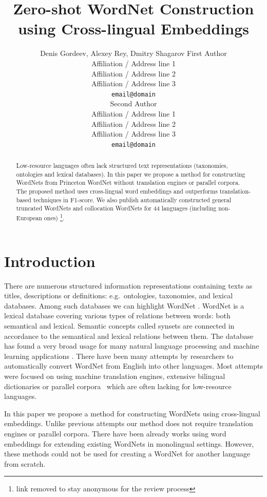 \documentclass[11pt,a4paper]{article}
\title{Zero-shot WordNet Construction using Cross-lingual Embeddings}
\author{Denis Gordeev, Alexey Rey, Dmitry Shagarov
	First Author \\
  Affiliation / Address line 1 \\
  Affiliation / Address line 2 \\
  Affiliation / Address line 3 \\
  \texttt{email@domain} \\\And
  Second Author \\
  Affiliation / Address line 1 \\
  Affiliation / Address line 2 \\
  Affiliation / Address line 3 \\
  \texttt{email@domain} \\}
\date{}
\begin{document}
\maketitle
\begin{abstract}
Low-resource languages often lack structured text representations (taxonomies, ontologies and lexical databases). In this paper we propose a method for constructing WordNets from Princeton WordNet without translation engines or parallel corpora. The proposed method uses cross-lingual word embeddings and outperforms translation-based techniques in F1-score. We also publish automatically constructed general truncated WordNets and collocation WordNets for 44 languages (including non-European ones) \footnote{link removed to stay anonymous for the review process}.
\end{abstract}

\section{Introduction}

There are numerous structured information representations containing texts as titles, descriptions or definitions: e.g.\ ontologies, taxonomies, and lexical databases. Among such databases we can highlight WordNet \cite{wordnet}. WordNet is a lexical database covering various types of relations between words: both semantical and lexical. Semantic concepts called synsets are connected in accordance to the semantical and lexical relations between them. The database has found a very broad usage for many natural language processing and machine learning applications \cite{kutuzovgraphwordnet,mao-semeval}.
There have been many attempts by researchers to automatically convert WordNet from English into other languages. Most attempts were focused on using machine translation engines, extensive bilingual dictionaries or parallel corpora~\cite{Khodak2017,NEALE18.1030} which are often lacking for low-resource languages.

In this paper we propose a method for constructing WordNets using cross-lingual embeddings. Unlike previous attempts our method does not require translation engines or parallel corpora. There have been already works using word embeddings for extending existing WordNets \cite{sand2017wordnet,tarouti} in monolingual settings. However, these methods could not be used for creating a WordNet for another language from scratch.
\end{document}
